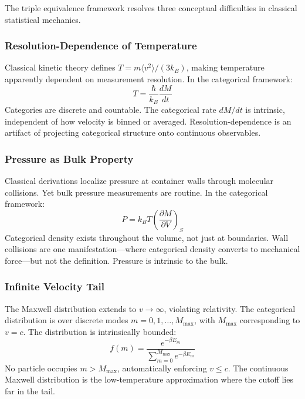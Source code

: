 The triple equivalence framework resolves three conceptual difficulties in classical statistical mechanics.

\subsubsection{Resolution-Dependence of Temperature}

Classical kinetic theory defines $T = m\langle v^2\rangle/(3k_B)$, making temperature apparently dependent on measurement resolution. In the categorical framework:
\begin{equation}
T = \frac{\hbar}{k_B}\frac{dM}{dt}
\end{equation}
Categories are discrete and countable. The categorical rate $dM/dt$ is intrinsic, independent of how velocity is binned or averaged. Resolution-dependence is an artifact of projecting categorical structure onto continuous observables.

\subsubsection{Pressure as Bulk Property}

Classical derivations localize pressure at container walls through molecular collisions. Yet bulk pressure measurements are routine. In the categorical framework:
\begin{equation}
P = k_B T \left(\frac{\partial M}{\partial V}\right)_{S}
\end{equation}
Categorical density exists throughout the volume, not just at boundaries. Wall collisions are one manifestation---where categorical density converts to mechanical force---but not the definition. Pressure is intrinsic to the bulk.

\subsubsection{Infinite Velocity Tail}

The Maxwell distribution extends to $v \to \infty$, violating relativity. The categorical distribution is over discrete modes $m = 0, 1, \ldots, M_{\max}$, with $M_{\max}$ corresponding to $v = c$. The distribution is intrinsically bounded:
\begin{equation}
f(m) = \frac{e^{-\beta E_m}}{\sum_{m=0}^{M_{\max}} e^{-\beta E_m}}
\end{equation}
No particle occupies $m > M_{\max}$, automatically enforcing $v \leq c$. The continuous Maxwell distribution is the low-temperature approximation where the cutoff lies far in the tail.

